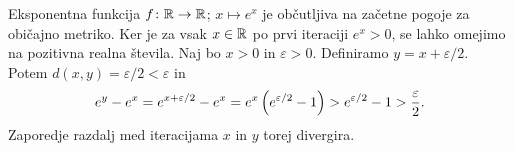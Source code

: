 \begin{primer}
    Eksponentna funkcija \(f \colon \mathbb R \to \mathbb R\); \(x \mapsto e^x\) je občutljiva na začetne pogoje za običajno metriko. Ker je za vsak \(x \in \mathbb R\) po prvi iteraciji \(e^x > 0\), se lahko omejimo na pozitivna realna števila. Naj bo \(x > 0\) in \(\varepsilon > 0\). Definiramo \(y = x + \varepsilon / 2\). Potem \(d (x, y) = \varepsilon / 2 < \varepsilon\) in
    \[e^{y} - e^{x} = e^{x + \varepsilon / 2} - e^x = e^x \left( e^{\varepsilon / 2} - 1 \right) > e^{\varepsilon / 2} - 1 > \frac{\varepsilon}{2}.\]
    Zaporedje razdalj med iteracijama \(x\) in \(y\) torej divergira.
\end{primer}


